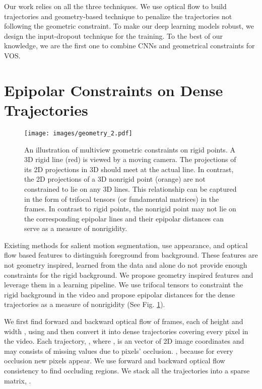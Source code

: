 \documentclass[10pt,twocolumn,letterpaper]{article}
\begin{document}
Our work relies on all the three techniques. We use optical flow to build trajectories and geometry-based technique to penalize the trajectories not following the geometric constraint.
To make our deep learning models robust, we design the input-dropout technique for the training.
To the best of our knowledge, we are the first one to combine CNNs and geometrical constraints for VOS.  
\section{Epipolar Constraints on Dense Trajectories}
\label{epipolarDistanceSection}

\begin{figure}[t]
\centering
\texttt{[image: images/geometry\_2.pdf]}
\caption{An illustration of multiview geometric constraints on rigid points. A 3D rigid line (red) is viewed by a moving camera. The projections of its 2D projections in 3D should meet at the actual line. In contrast, the 2D projections of a 3D nonrigid point (orange) are not constrained to lie on any 3D lines. This relationship can be captured in the form of trifocal tensors (or fundamental matrices) in the frames. In contrast to rigid points, the nonrigid point may not lie on the corresponding epipolar lines and their epipolar distances can serve as a measure of nonrigidity.}
\label{fig:geometryFig}
\vspace{-0.5cm}
\end{figure}

Existing methods for salient motion segmentation, use appearance, and optical flow based features to distinguish foreground from background. These features are not geometry inspired, learned from the data and alone do not provide enough constraints for the rigid background. We propose geometry inspired features and leverage them in a learning pipeline. We use trifocal tensors to constraint the rigid background in the video and propose epipolar distances for the dense trajectories as a measure of nonrigidity (See Fig. \ref{fig:geometryFig}).

We first find forward and backward optical flow of  frames, each of height  and width , using \cite{chen2016full} and then convert it into  dense trajectories covering every pixel in the video. Each trajectory, , where , is an  vector of 2D image coordinates and may consists of missing values due to pixels' occlusion. , because for every occlusion new pixels appear. 
We use forward and backward optical flow consistency to find occluding regions.
We stack all the trajectories into a  sparse matrix, . 
\end{document}
